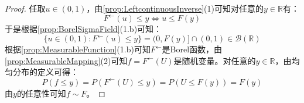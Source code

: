 \begin{proof}
	任取$u\in(0,1)$，由\cref{prop:LeftcontinuousInverse}(1)可知对任意的$y\in\mathbb{R}$有：
	\begin{equation*}
		F^{\leftarrow}(u)\leqslant y\iff u\leqslant F(y)
	\end{equation*}
	于是根据\cref{prop:BorelSigmaField}(1.b)可知：
	\begin{equation*}
		\{u\in(0,1):F^{\leftarrow}(u)\leqslant y\}=(0,F(y)]\cap(0,1)\in\mathcal{B}(\mathbb{R})
	\end{equation*}
	根据\cref{prop:MeasurableFunction}(1.b)可知$F^{\leftarrow}$是Borel函数，由\cref{prop:MeasurableMapping}(2)可知$f=F^{\leftarrow}(U)$是随机变量。对任意的$y\in\mathbb{R}$，由均匀分布的定义可得：
	\begin{equation*}
		P(f\leqslant y)=P(F^{\leftarrow}(U)\leqslant y)=P(U\leqslant F(y))=F(y)
	\end{equation*}
	由$y$的任意性可知$f\sim F$。
\end{proof}
